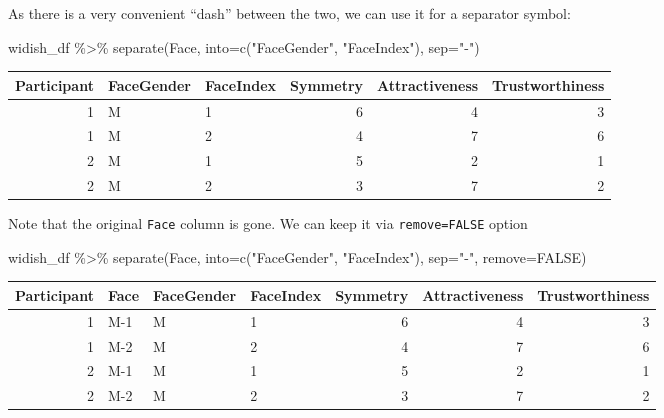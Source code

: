 \documentclass[
]{book}
\newenvironment{Shaded}{\begin{snugshade}}{\end{snugshade}}
\newcommand{\AttributeTok}[1]{\textcolor[rgb]{0.77,0.63,0.00}{#1}}
\newcommand{\ConstantTok}[1]{\textcolor[rgb]{0.00,0.00,0.00}{#1}}
\newcommand{\FunctionTok}[1]{\textcolor[rgb]{0.00,0.00,0.00}{#1}}
\newcommand{\NormalTok}[1]{#1}
\newcommand{\SpecialCharTok}[1]{\textcolor[rgb]{0.00,0.00,0.00}{#1}}
\newcommand{\StringTok}[1]{\textcolor[rgb]{0.31,0.60,0.02}{#1}}
\begin{document}
As there is a very convenient ``dash'' between the two, we can use it for a separator symbol:

\begin{Shaded}
\begin{Highlighting}[]
\NormalTok{widish\_df }\SpecialCharTok{\%\textgreater{}\%}
  \FunctionTok{separate}\NormalTok{(Face, }\AttributeTok{into=}\FunctionTok{c}\NormalTok{(}\StringTok{"FaceGender"}\NormalTok{, }\StringTok{"FaceIndex"}\NormalTok{), }\AttributeTok{sep=}\StringTok{"{-}"}\NormalTok{)}
\end{Highlighting}
\end{Shaded}

\begin{tabular}{r|l|l|r|r|r}
\hline
Participant & FaceGender & FaceIndex & Symmetry & Attractiveness & Trustworthiness\\
\hline
1 & M & 1 & 6 & 4 & 3\\
\hline
1 & M & 2 & 4 & 7 & 6\\
\hline
2 & M & 1 & 5 & 2 & 1\\
\hline
2 & M & 2 & 3 & 7 & 2\\
\hline
\end{tabular}

Note that the original \texttt{Face} column is gone. We can keep it via \texttt{remove=FALSE} option

\begin{Shaded}
\begin{Highlighting}[]
\NormalTok{widish\_df }\SpecialCharTok{\%\textgreater{}\%}
  \FunctionTok{separate}\NormalTok{(Face, }\AttributeTok{into=}\FunctionTok{c}\NormalTok{(}\StringTok{"FaceGender"}\NormalTok{, }\StringTok{"FaceIndex"}\NormalTok{), }\AttributeTok{sep=}\StringTok{"{-}"}\NormalTok{, }\AttributeTok{remove=}\ConstantTok{FALSE}\NormalTok{)}
\end{Highlighting}
\end{Shaded}

\begin{tabular}{r|l|l|l|r|r|r}
\hline
Participant & Face & FaceGender & FaceIndex & Symmetry & Attractiveness & Trustworthiness\\
\hline
1 & M-1 & M & 1 & 6 & 4 & 3\\
\hline
1 & M-2 & M & 2 & 4 & 7 & 6\\
\hline
2 & M-1 & M & 1 & 5 & 2 & 1\\
\hline
2 & M-2 & M & 2 & 3 & 7 & 2\\
\hline
\end{tabular}
\end{document}
